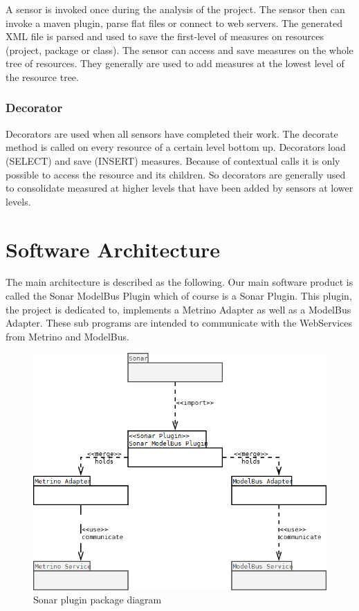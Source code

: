 A sensor is invoked once during the analysis of the project. The
sensor then can invoke a maven plugin, parse flat files or connect to
web servers. The generated XML file is parsed and used to save the
first-level of measures on resources (project, package or class). The
sensor can access and save measures on the whole tree of
resources. They generally are used to add measures at the lowest level
of the resource tree.

\subsubsection{Decorator}

Decorators are used when all sensors have completed their work. The
decorate method is called on every resource of a certain level bottom
up. Decorators load (SELECT) and save (INSERT) measures. Because of
contextual calls it is only possible to access the resource and its
children. So decorators are generally used to consolidate measured at
higher levels that have been added by sensors at lower levels.

\section{Software Architecture}
The main architecture is described as the following. Our main software
product is called the Sonar ModelBus Plugin which of course is a Sonar
Plugin. This plugin, the project is dedicated to, implements a Metrino
Adapter as well as a ModelBus Adapter. These sub programs are intended
to communicate with the WebServices from Metrino and ModelBus.

\begin{figure}[h]
	\centering
		\includegraphics[width=\textwidth]{plugin_package_dia}
	\caption{Sonar plugin package diagram}
	\label{fig:sonarrunning}
\end{figure}


